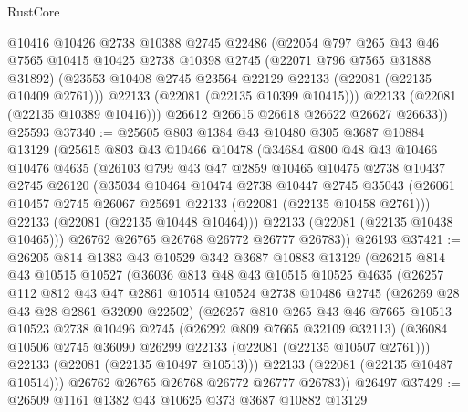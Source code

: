 \begin{lexlean}{RustCore}
\begin{coremodule}
          @10416
          @10426
          @2738
          @10388
          @2745
          @22486
          (@22054
            @797
            @265
            @43
            @46
            @7565
            @10415
            @10425
            @2738
            @10398
            @2745
            (@22071 @796 @7565 @31888 @31892)
            (@23553 @10408 @2745 @23564 @22129 @22133 (@22081 (@22135 @10409 @2761)))
            @22133
            (@22081 (@22135 @10399 @10415)))
          @22133
          (@22081 (@22135 @10389 @10416)))
        @26612
        @26615
        @26618
        @26622
        @26627
        @26633))
    @25593
@37340 := @25605
    @803
    @1384
    @43
    @10480
    @305
    @3687
    @10884
    @13129
    (@25615
      @803
      @43
      @10466
      @10478
      (@34684
        @800
        @48
        @43
        @10466
        @10476
        @4635
        (@26103
          @799
          @43
          @47
          @2859
          @10465
          @10475
          @2738
          @10437
          @2745
          @26120
          (@35034
            @10464
            @10474
            @2738
            @10447
            @2745
            @35043
            (@26061 @10457 @2745 @26067 @25691 @22133 (@22081 (@22135 @10458 @2761)))
            @22133
            (@22081 (@22135 @10448 @10464)))
          @22133
          (@22081 (@22135 @10438 @10465)))
        @26762
        @26765
        @26768
        @26772
        @26777
        @26783))
    @26193
@37421 := @26205
    @814
    @1383
    @43
    @10529
    @342
    @3687
    @10883
    @13129
    (@26215
      @814
      @43
      @10515
      @10527
      (@36036
        @813
        @48
        @43
        @10515
        @10525
        @4635
        (@26257
          @112
          @812
          @43
          @47
          @2861
          @10514
          @10524
          @2738
          @10486
          @2745
          (@26269 @28 @43 @28 @2861 @32090 @22502)
          (@26257
            @810
            @265
            @43
            @46
            @7665
            @10513
            @10523
            @2738
            @10496
            @2745
            (@26292 @809 @7665 @32109 @32113)
            (@36084 @10506 @2745 @36090 @26299 @22133 (@22081 (@22135 @10507 @2761)))
            @22133
            (@22081 (@22135 @10497 @10513)))
          @22133
          (@22081 (@22135 @10487 @10514)))
        @26762
        @26765
        @26768
        @26772
        @26777
        @26783))
    @26497
@37429 := @26509 @1161 @1382 @43 @10625 @373 @3687 @10882 @13129

\end{coremodule}
\end{lexlean}
